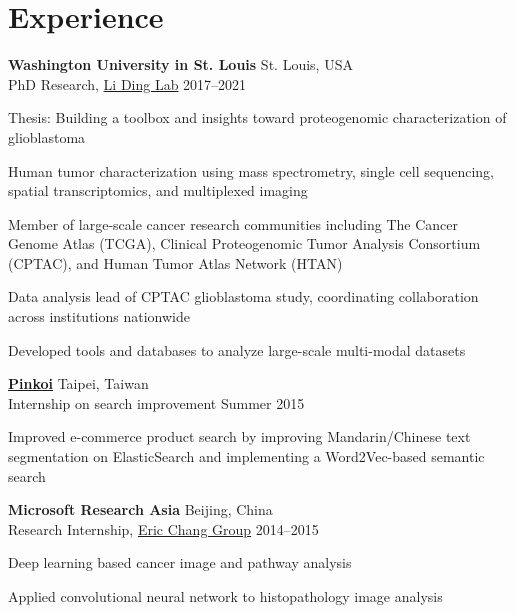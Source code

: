 \section{Experience}

\begin{entrylist}

	\item \textbf{Washington University in St. Louis} \hfill St. Louis, USA\\
	PhD Research, \href{https://dinglab.wustl.edu/}{Li Ding Lab} \hfill
	2017--2021
	\begin{detaillist}
		\item Thesis: Building a toolbox and insights toward proteogenomic characterization of glioblastoma
		\item Human tumor characterization using mass spectrometry, single cell sequencing, spatial transcriptomics, and multiplexed imaging
		\item Member of large-scale cancer research communities including The Cancer Genome Atlas (TCGA), Clinical Proteogenomic Tumor Analysis Consortium (CPTAC), and Human Tumor Atlas Network (HTAN)
		\item Data analysis lead of CPTAC glioblastoma study, coordinating collaboration across institutions nationwide
		\item Developed tools and databases to analyze large-scale multi-modal datasets
	\end{detaillist}

	\item \href{http://pinkoi.com}{\textbf{Pinkoi}} \hfill Taipei, Taiwan\\
	Internship on search improvement \hfill
	Summer 2015
	\begin{detaillist}
		\item Improved e-commerce product search by improving Mandarin/Chinese text segmentation on ElasticSearch and implementing a Word2Vec-based semantic search
	\end{detaillist}

	\item \textbf{Microsoft Research Asia} \hfill Beijing, China\\
	Research Internship, \href{https://www.microsoft.com/en-us/research/people/echang/}{Eric Chang Group} \hfill
	2014--2015
	\begin{detaillist}
		\item Deep learning based cancer image and pathway analysis
		\item Applied convolutional neural network to histopathology image analysis
	\end{detaillist}


\end{entrylist}
